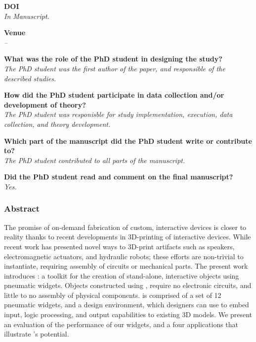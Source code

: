   \bigskip

  \noindent
  \textbf{DOI}\\
  \textit{In Manuscript.}

  \bigskip

  \noindent
  \textbf{Venue}\\
  \textit{--}

  \bigskip

  \noindent
  \textbf{What was the role of the PhD student in designing the study?}\\
  \textit{The PhD student was the first author of the paper, and responsible
    of the described studies.}

  \bigskip

  \noindent
  \textbf{How did the PhD student participate in data collection and/or development of theory?}\\
  \textit{The PhD student was responisble for study implementation, execution,
    data collection, and theory development.}

  \bigskip

  \noindent
  \textbf{Which part of the manuscript did the PhD student write or contribute to?}\\
  \textit{The PhD student contributed to all parts of the manuscript.}

  \bigskip

  \noindent
  \textbf{Did the PhD student read and comment on the final manuscript?}\\
  \textit{Yes.}

  \bigskip
  \vfill

  \newpage

  \subsubsection*{Abstract}
    The promise of on-demand fabrication of custom, interactive devices is
    closer to reality thanks to recent developments in 3D-printing of
    interactive devices. While recent work has presented novel ways to
    3D-print artifacts such as speakers, electromagnetic actuators, and
    hydraulic robots; these efforts are non-trivial to instantiate,
    requiring assembly of circuits or mechanical parts. The present work
    introduces \al: a toolkit for the creation of stand-alone, interactive
    objects using pneumatic widgets. Objects constructed using \al, require
    no electronic circuits, and little to no assembly of physical
    components. \al is comprised of a set of 12 pneumatic widgets, and a
    design environment, which designers can use to embed input, logic
    processing, and output capabilities to existing 3D models. We present
    an evaluation of the performance of our widgets, and a four
    applications that illustrate \al's potential.

